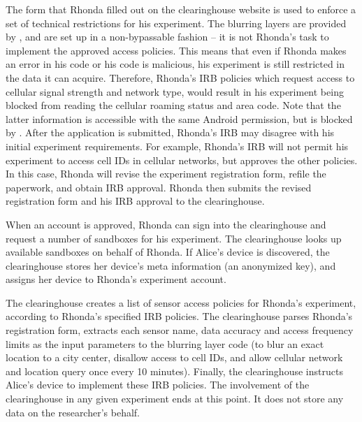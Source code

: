 The form that Rhonda filled out on the clearinghouse website is used to
enforce a set of technical restrictions for his experiment. 
The blurring layers are provided by 
\sysname, and are set up in a non-bypassable fashion -- it is not 
Rhonda's task to implement the approved access policies. This means
that even if Rhonda makes an error in his code or his code is malicious, his 
experiment is still restricted in the data it can acquire. 
Therefore, Rhonda's IRB 
policies which request access to cellular signal strength and network type, would result 
in his experiment being blocked from reading the cellular roaming status and area 
code. Note that the latter information is accessible with the same 
Android permission, but is blocked by \sysname. 
After the application is submitted, Rhonda's IRB may disagree with 
his initial experiment requirements. For example, Rhonda's IRB will not permit
his experiment to access cell IDs in cellular networks, but 
approves the other policies. 
In this case, Rhonda will revise the experiment registration form, refile the paperwork, 
and obtain IRB approval. Rhonda then submits the revised  
registration form and his IRB approval to the clearinghouse.

 When an account is approved, Rhonda 
can sign into the clearinghouse and request a 
number of sandboxes for his experiment. The clearinghouse 
looks up available sandboxes on behalf of Rhonda. If Alice's device is discovered, the 
clearinghouse stores her device's meta information (an anonymized 
key), %
and assigns her device to Rhonda's experiment account. 

The clearinghouse creates a list of sensor access policies for Rhonda's
experiment, according to Rhonda's specified IRB policies. The 
clearinghouse parses Rhonda's registration form, extracts each sensor name, 
data accuracy and access frequency limits as the 
input parameters to the blurring layer code (to blur an exact location 
to a city center, disallow access to cell IDs, and allow cellular network and 
location query once every 10 minutes). Finally, the clearinghouse 
instructs Alice's device to implement these IRB policies. The involvement 
of the clearinghouse in any given experiment ends at this point.
It does not store any data on the researcher's behalf. 

